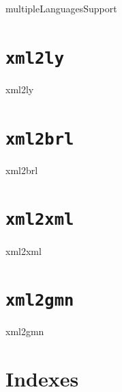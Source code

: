 \documentclass[11pt,a4paper]{report}
\begin{document}
{multipleLanguagesSupport}


\part{{\tt xml2ly}}

{xml2ly}


\part{{\tt xml2brl}}

{xml2brl}


\part{{\tt xml2xml}}

{xml2xml}


\part{{\tt xml2gmn}}

{xml2gmn}



\part{Indexes}

\fancyhead[L]{}
\fancyhead[C]{\nouppercase\leftmark}
\fancyhead[R]{}

\printindex[Files]

\printindex[Options]

\printindex[MusicXML]

\printindex[Main]


\end{document}
